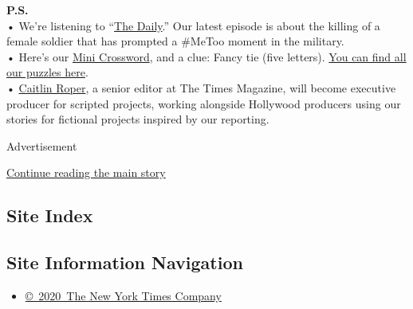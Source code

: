 \textbf{P.S.}\\
• We're listening to
``\href{https://www.nytimes.com/2020/07/31/podcasts/the-daily/vanessa-guillen-military-metoo.html}{The
Daily}.'' Our latest episode is about the killing of a female soldier
that has prompted a \#MeToo moment in the military.\\
• Here's our \href{https://www.nytimes.com/crosswords/game/mini}{Mini
Crossword}, and a clue: Fancy tie (five letters).
\href{https://www.nytimes.com/crosswords}{You can find all our puzzles
here}.\\
•
\href{https://www.nytco.com/press/caitlin-roper-named-executive-producer-for-scripted-projects/}{Caitlin
Roper}, a senior editor at The Times Magazine, will become executive
producer for scripted projects, working alongside Hollywood producers
using our stories for fictional projects inspired by our reporting.

Advertisement

\protect\hyperlink{after-bottom}{Continue reading the main story}

\hypertarget{site-index}{%
\subsection{Site Index}\label{site-index}}

\hypertarget{site-information-navigation}{%
\subsection{Site Information
Navigation}\label{site-information-navigation}}

\begin{itemize}
\tightlist
\item
  \href{https://help.nytimes.com/hc/en-us/articles/115014792127-Copyright-notice}{©~2020~The
  New York Times Company}
\end{itemize}


